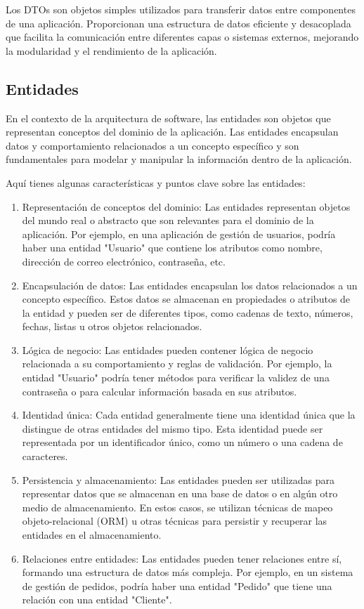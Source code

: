 \documentclass[executivepaper]{article}
\begin{document}
Los DTOs son objetos simples utilizados para transferir datos entre componentes de una aplicación. Proporcionan una estructura de datos eficiente y desacoplada que facilita la comunicación entre diferentes capas o sistemas externos, mejorando la modularidad y el rendimiento de la aplicación.

\subsection{Entidades}

En el contexto de la arquitectura de software, las entidades son objetos que representan conceptos del dominio de la aplicación. Las entidades encapsulan datos y comportamiento relacionados a un concepto específico y son fundamentales para modelar y manipular la información dentro de la aplicación.

Aquí tienes algunas características y puntos clave sobre las entidades:
\begin{enumerate}
    \item Representación de conceptos del dominio: Las entidades representan objetos del mundo real o abstracto que son relevantes para el dominio de la aplicación. Por ejemplo, en una aplicación de gestión de usuarios, podría haber una entidad "Usuario" que contiene los atributos como nombre, dirección de correo electrónico, contraseña, etc.
    \item Encapsulación de datos: Las entidades encapsulan los datos relacionados a un concepto específico. Estos datos se almacenan en propiedades o atributos de la entidad y pueden ser de diferentes tipos, como cadenas de texto, números, fechas, listas u otros objetos relacionados.
    \item Lógica de negocio: Las entidades pueden contener lógica de negocio relacionada a su comportamiento y reglas de validación. Por ejemplo, la entidad "Usuario" podría tener métodos para verificar la validez de una contraseña o para calcular información basada en sus atributos.
    \item Identidad única: Cada entidad generalmente tiene una identidad única que la distingue de otras entidades del mismo tipo. Esta identidad puede ser representada por un identificador único, como un número o una cadena de caracteres.
    \item Persistencia y almacenamiento: Las entidades pueden ser utilizadas para representar datos que se almacenan en una base de datos o en algún otro medio de almacenamiento. En estos casos, se utilizan técnicas de mapeo objeto-relacional (ORM) u otras técnicas para persistir y recuperar las entidades en el almacenamiento.
    \item Relaciones entre entidades: Las entidades pueden tener relaciones entre sí, formando una estructura de datos más compleja. Por ejemplo, en un sistema de gestión de pedidos, podría haber una entidad "Pedido" que tiene una relación con una entidad "Cliente".
\end{enumerate}
\end{document}
